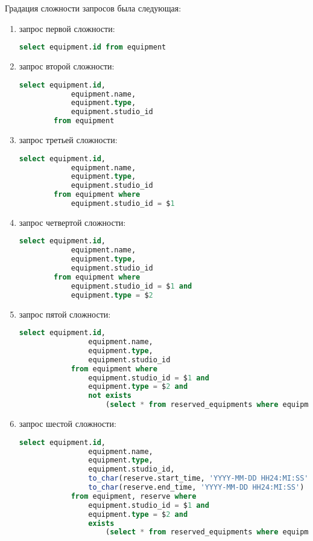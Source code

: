 Градация сложности запросов была следующая:
\begin{enumerate}
	\item запрос первой сложности:
		\begin{lstlisting}[language=sql, label=lst:query_1]
		select equipment.id from equipment\end{lstlisting}
	\item запрос второй сложности:
		\begin{lstlisting}[language=sql, label=lst:query_2]
		select equipment.id,
			equipment.name,
			equipment.type,
			equipment.studio_id
		from equipment\end{lstlisting}
	\item запрос третьей сложности:
		\begin{lstlisting}[language=sql, label=lst:query_2]
		select equipment.id,
			equipment.name,
			equipment.type,
			equipment.studio_id
		from equipment where 
			equipment.studio_id = $1\end{lstlisting}
	\item запрос четвертой сложности:
		\begin{lstlisting}[language=sql, label=lst:query_2]
		select equipment.id,
			equipment.name,
			equipment.type,
			equipment.studio_id
		from equipment where 
			equipment.studio_id = $1 and
			equipment.type = $2\end{lstlisting}
	\item запрос пятой сложности:
			\begin{lstlisting}[language=sql, label=lst:query_2]
			select equipment.id,
				equipment.name,
				equipment.type,
				equipment.studio_id
			from equipment where 
				equipment.studio_id = $1 and
				equipment.type = $2 and 
				not exists
					(select * from reserved_equipments where equipment.id = reserved_equipments.equipment_id)\end{lstlisting}
	\item запрос шестой сложности:
			\begin{lstlisting}[language=sql, label=lst:query_2]
			select equipment.id, 
				equipment.name,
				equipment.type,
				equipment.studio_id,
				to_char(reserve.start_time, 'YYYY-MM-DD HH24:MI:SS'),
				to_char(reserve.end_time, 'YYYY-MM-DD HH24:MI:SS')
			from equipment, reserve where 
				equipment.studio_id = $1 and 
				equipment.type = $2 and 
				exists 
					(select * from reserved_equipments where equipment.id = reserved_equipments.equipment_id)\end{lstlisting}
\end{enumerate}  

